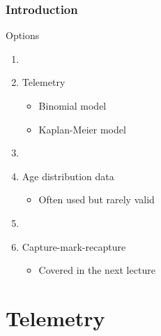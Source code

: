 \documentclass[color=usenames,dvipsnames]{beamer}\usepackage[]{graphicx}\usepackage[]{color}
\begin{document}
\begin{frame}
  \frametitle{Introduction}
  \Large %
  {%
    Options}
  \begin{enumerate}[\bf (1)]
    \large
    \item[]
    \item Telemetry
      \begin{itemize}
        \large
        \item Binomial model
        \item Kaplan-Meier model
      \end{itemize}
    \item[]
    \item<2-> Age distribution data
      \begin{itemize}
        \item Often used but rarely valid
      \end{itemize}
    \item[]
    \item<3-> Capture-mark-recapture
      \begin{itemize}
        \item Covered in the next lecture
      \end{itemize}
  \end{enumerate}
\end{frame}




\section{Telemetry}



\end{document}
